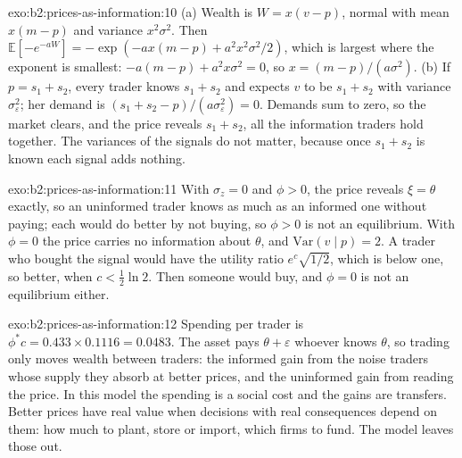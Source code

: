 \begin{solution}{exo:b2:prices-as-information:10}
(a) Wealth is $W = x(v - p)$, normal with mean $x(m - p)$ and variance $x^2\sigma^2$. Then $\mathbb{E}[-e^{-aW}] =
-\exp(-ax(m - p) + a^2x^2\sigma^2/2)$, which is largest where the exponent is smallest: $-a(m - p) + a^2x\sigma^2 =
0$, so $x = (m - p)/(a\sigma^2)$. (b) If $p = s_1 + s_2$, every trader knows $s_1 + s_2$ and expects $v$ to be $s_1 + s_2$
with variance $\sigma_\varepsilon^2$; her demand is $(s_1 + s_2 - p)/(a\sigma_\varepsilon^2) = 0$. Demands sum to
zero, so the market clears, and the price reveals $s_1 + s_2$, all the information traders hold together. The
variances of the signals do not matter, because once $s_1 + s_2$ is known each signal adds nothing.
\end{solution}

\begin{solution}{exo:b2:prices-as-information:11}
With $\sigma_z = 0$ and $\phi > 0$, the price reveals $\xi = \theta$ exactly, so an uninformed trader knows as much as
an informed one without paying; each  would do better by not buying, so $\phi > 0$ is not an
equilibrium. With $\phi = 0$ the price carries no information about $\theta$, and $\mathrm{Var}(v \mid p) = 2$.
A trader who bought the signal would have the utility ratio $e^{c}\sqrt{1/2}$, which is below one, so better,
when $c < \tfrac12\ln 2$. Then someone would buy, and $\phi = 0$ is not an equilibrium either.
\end{solution}

\begin{solution}{exo:b2:prices-as-information:12}
Spending per trader is $\phi^* c = 0.433 \times 0.1116 = 0.0483$. The asset pays $\theta + \varepsilon$ whoever knows
$\theta$, so trading only moves wealth between traders: the informed gain from the noise traders whose
supply they absorb at better prices, and the uninformed gain from reading the price. In this model the
spending is a social cost and the gains are transfers. Better prices have real value when decisions with
real consequences depend on them: how much to plant, store or import, which firms to fund. The model leaves
those out.
\end{solution}

